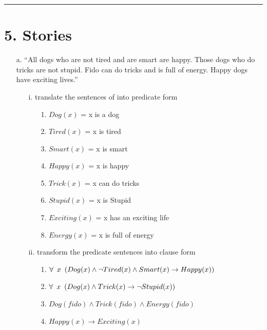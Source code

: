 \documentclass[11pt]{article}
\begin{document}
\begin{flushleft}
\rule[0.1pt]{40em}{1.0pt}

\section*{5. Stories}
\begin{enumerate}

    \item[a.] “All dogs who are not tired and are smart are happy.  Those dogs
        who do tricks are not stupid.  Fido can do tricks and is full of
        energy.  Happy dogs have exciting lives.”

        \begin{enumerate}
            \item[i.] translate the sentences of into predicate form

                \begin{enumerate}
                    \item[1.] $Dog(x)$ = x is a dog
                    \item[2.] $Tired(x)$ = x is tired
                    \item[3.] $Smart(x)$ = x is smart
                    \item[4.] $Happy(x)$ = x is happy
                    \item[5.] $Trick(x)$ = x can do tricks
                    \item[6.] $Stupid(x)$ = x is Stupid
                    \item[7.] $Exciting(x)$ = x has an exciting life
                    \item[8.] $Energy(x)$ = x is full of energy
                \end{enumerate}

            \item[ii.] transform the predicate sentences into clause form

                \begin{enumerate}
                    \item[1.] $\forall \hspace{0.5em} x \hspace{0.5em}
                        (Dog(x) \wedge \neg Tired(x) \wedge Smart(x) \rightarrow
                        Happy(x))$
                    \item[2.] $\forall \hspace{0.5em} x \hspace{0.5em}
                        (Dog(x) \wedge Trick(x) \rightarrow \neg Stupid(x))$
                    \item[3.] $Dog(fido) \wedge Trick(fido) \wedge Energy(fido)$
                    \item[4.] $Happy(x) \rightarrow Exciting(x)$
                \end{enumerate}


\end{enumerate}
\end{enumerate}
\end{flushleft}
\end{document}

